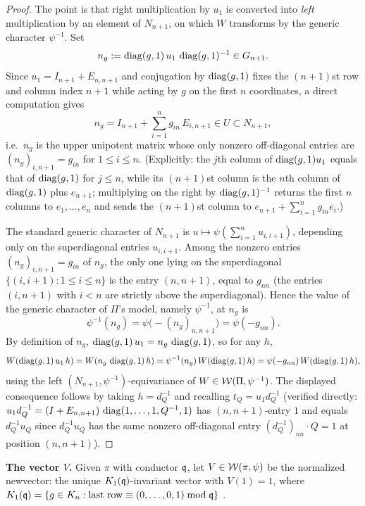 \begin{proof}
The point is that right multiplication by $u_1$ is converted into \emph{left} multiplication
by an element of $N_{n+1}$, on which $W$ transforms by the generic character $\psi^{-1}$. Set
\[
n_g:=\operatorname{diag}(g,1)\,u_1\,\operatorname{diag}(g,1)^{-1}\in G_{n+1}.
\]
Since $u_1=I_{n+1}+E_{n,n+1}$ and conjugation by $\operatorname{diag}(g,1)$ fixes the $(n+1)$st row
and column index $n+1$ while acting by $g$ on the first $n$ coordinates, a direct computation
gives
\[
n_g=I_{n+1}+\sum_{i=1}^{n}g_{in}\,E_{i,n+1}\in U\subset N_{n+1},
\]
i.e.\ $n_g$ is the upper unipotent matrix whose only nonzero off-diagonal entries are
$(n_g)_{i,n+1}=g_{in}$ for $1\le i\le n$. \textup{(}Explicitly: the $j$th column of
$\operatorname{diag}(g,1)u_1$ equals that of $\operatorname{diag}(g,1)$ for $j\le n$, while its $(n+1)$st column is
the $n$th column of $\operatorname{diag}(g,1)$ plus $e_{n+1}$; multiplying on the right by
$\operatorname{diag}(g,1)^{-1}$ returns the first $n$ columns to $e_1,\dots,e_n$ and sends the
$(n+1)$st column to $e_{n+1}+\sum_{i=1}^n g_{in}e_i$.\textup{)}

The standard generic character of $N_{n+1}$ is $u\mapsto\psi(\sum_{i=1}^{n}u_{i,i+1})$, depending
only on the superdiagonal entries $u_{i,i+1}$. Among the nonzero entries $(n_g)_{i,n+1}=g_{in}$
of $n_g$, the only one lying on the superdiagonal $\{(i,i+1):1\le i\le n\}$ is the entry
$(n,n+1)$, equal to $g_{nn}$ \textup{(}the entries $(i,n+1)$ with $i<n$ are strictly above the
superdiagonal\textup{)}. Hence the value of the generic character of $\Pi$'s model, namely
$\psi^{-1}$, at $n_g$ is
\[
\psi^{-1}(n_g)=\psi\!\big(-(n_g)_{n,n+1}\big)=\psi(-g_{nn}).
\]
By definition of $n_g$, $\operatorname{diag}(g,1)\,u_1=n_g\,\operatorname{diag}(g,1)$, so for any $h$,
\[
W(\operatorname{diag}(g,1)\,u_1\,h)=W(n_g\,\operatorname{diag}(g,1)\,h)
=\psi^{-1}(n_g)\,W(\operatorname{diag}(g,1)\,h)=\psi(-g_{nn})\,W(\operatorname{diag}(g,1)\,h),
\]
using the left $(N_{n+1},\psi^{-1})$-equivariance of $W\in\mathcal{W}(\Pi,\psi^{-1})$. The displayed
consequence follows by taking $h=d_Q^{-1}$ and recalling $t_Q=u_1 d_Q^{-1}$
\textup{(}verified directly: $u_1 d_Q^{-1}=(I+E_{n,n+1})\,\operatorname{diag}(1,\dots,1,Q^{-1},1)$ has
$(n,n+1)$-entry $1$ and equals $d_Q^{-1}u_Q$ since $d_Q^{-1}u_Q$ has the same nonzero
off-diagonal entry $(d_Q^{-1})_{nn}\cdot Q=1$ at position $(n,n+1)$\textup{)}.
\end{proof}

\noindent\textbf{The vector $V$.} Given $\pi$ with conductor $\mathfrak{q}$, let
$V\in\mathcal{W}(\pi,\psi)$ be the normalized newvector: the unique $K_1(\mathfrak{q})$-invariant
vector with $V(1)=1$, where
$K_1(\mathfrak{q})=\{g\in K_n:\text{last row}\equiv(0,\dots,0,1)\bmod\mathfrak{q}\}$
\cite{JPSS81,Matringe}.

